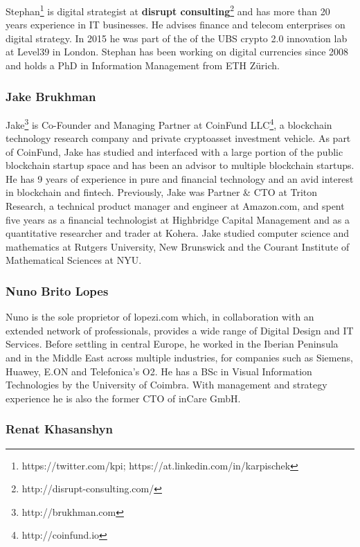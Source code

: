 \documentclass[12pt]{article}
\begin{document}
Stephan\footnote{https://twitter.com/kpi; https://at.linkedin.com/in/karpischek}
 is digital strategist at \textbf{disrupt consulting}\footnote{http://disrupt-consulting.com/} and has more than 20 years experience in IT businesses. He advises finance and telecom enterprises on digital strategy. In 2015 he was part of the of the UBS crypto 2.0 innovation lab at Level39 in London. Stephan has been working on digital currencies since 2008 and holds a PhD in Information Management from ETH Zürich.
 
\subsubsection{Jake Brukhman}

Jake\footnote{http://brukhman.com} is Co-Founder and Managing Partner at CoinFund LLC\footnote{http://coinfund.io}, a blockchain technology research company and private cryptoasset investment vehicle. As part of CoinFund, Jake has studied and interfaced with a large portion of the public blockchain startup space and has been an advisor to multiple blockchain startups. He has 9 years of experience in pure and financial technology and an avid interest in blockchain and fintech. Previously, Jake was Partner \& CTO at Triton Research, a technical product manager and engineer at Amazon.com, and spent five years as a financial technologist at Highbridge Capital Management and as a quantitative researcher and trader at Kohera. Jake studied computer science and mathematics at Rutgers University, New Brunswick and the Courant Institute of Mathematical Sciences at NYU.

\subsubsection{Nuno Brito Lopes}

Nuno is the sole proprietor of lopezi.com which, in collaboration with an extended network of professionals, provides a wide range of Digital Design and IT Services. Before settling in central Europe, he worked in the Iberian Peninsula and in the Middle East across multiple industries, for companies such as Siemens, Huawey, E.ON and Telefonica’s O2. He has a BSc in Visual Information Technologies by the University of Coimbra. With management and strategy experience he is also the former CTO of inCare GmbH. 

\subsubsection{Renat Khasanshyn}
\end{document}
